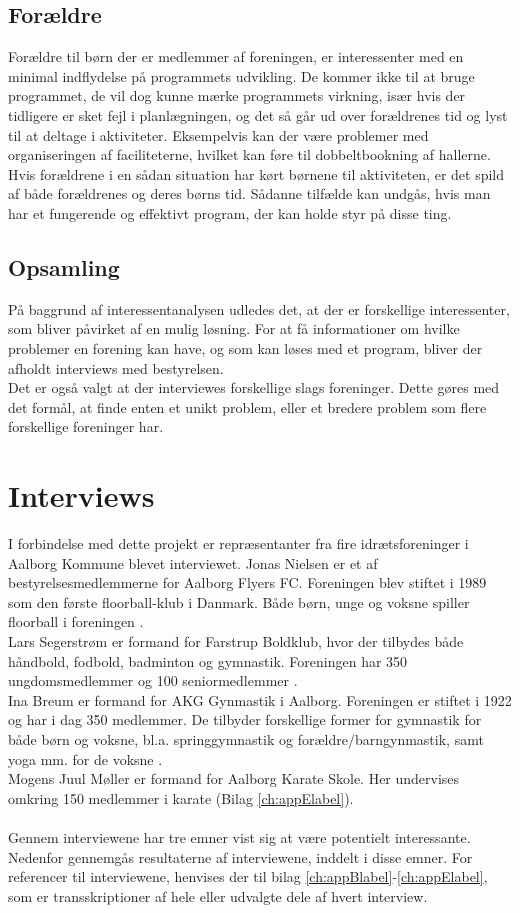 \subsection*{Forældre}
Forældre til børn der er medlemmer af foreningen, er interessenter med en minimal indflydelse på programmets udvikling. De kommer ikke til at bruge programmet, de vil dog kunne mærke programmets virkning, især hvis der tidligere er sket fejl i planlægningen, og det så går ud over forældrenes tid og lyst til at deltage i aktiviteter. Eksempelvis kan der være problemer med organiseringen af faciliteterne, hvilket kan føre til dobbeltbookning af hallerne. Hvis forældrene i en sådan situation har kørt børnene til aktiviteten, er det spild af både forældrenes og deres børns tid. Sådanne tilfælde kan undgås, hvis man har et fungerende og effektivt program, der kan holde styr på disse ting.

\subsection*{Opsamling}
På baggrund af interessentanalysen udledes det, at der er forskellige interessenter, som bliver påvirket af en mulig løsning. For at få informationer om hvilke problemer en forening kan have, og som kan løses med et program, bliver der afholdt interviews med bestyrelsen. \\
Det er også valgt at der interviewes forskellige slags foreninger. Dette gøres med det formål, at finde enten et unikt problem, eller et bredere problem som flere forskellige foreninger har.\\

\section{Interviews}\label{Interviews}
I forbindelse med dette projekt er repræsentanter fra fire idrætsforeninger i Aalborg Kommune blevet interviewet. 
Jonas Nielsen er et af bestyrelsesmedlemmerne for Aalborg Flyers FC. Foreningen blev stiftet i 1989 som den første floorball-klub i Danmark. Både børn, unge og voksne spiller floorball i foreningen \citep{AalborgFlyers}.\\
Lars Segerstrøm er formand for Farstrup Boldklub, hvor der tilbydes både håndbold, fodbold, badminton og gymnastik. Foreningen har 350 ungdomsmedlemmer og 100 seniormedlemmer \citep{Farstrup}.\\ 
Ina Breum er formand for AKG Gynmastik i Aalborg. Foreningen er stiftet i 1922 og har i dag 350 medlemmer. De tilbyder forskellige former for gymnastik for både børn og voksne, bl.a. springgymnastik og forældre/barngynmastik, samt yoga mm. for de voksne \citep{AKG}.\\
Mogens Juul Møller er formand for Aalborg Karate Skole. Her undervises omkring 150 medlemmer i karate (Bilag \ref{ch:appElabel}). 
\\\\
Gennem interviewene har tre emner vist sig at være potentielt interessante. Nedenfor gennemgås resultaterne af interviewene, inddelt i disse emner. For referencer til interviewene, henvises der til bilag \ref{ch:appBlabel}-\ref{ch:appElabel}, som er transskriptioner af hele eller udvalgte dele af hvert interview.

